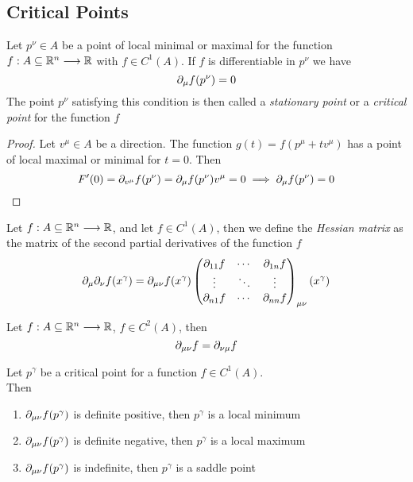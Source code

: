 \documentclass[../complete.tex]{subfiles}
\begin{document}
\subsection{Critical Points}
\begin{thm}[Fermat]
	Let $p^\nu\in A$ be a point of local minimal or maximal for the function $f:A\subseteq\mathbb{R}^n\overset{}{\longrightarrow}\mathbb{R}$ with $f\in C^1(A)$. If $f$ is differentiable in $p^\nu$ we have
	\begin{equation}
		\partial_\mu f(p^\nu)=0
		\label{eq:fermthm}
	\end{equation}
	The point $p^\nu$ satisfying this condition is then called a \textit{stationary point} or a \textit{critical point} for the function $f$
\end{thm}
\begin{proof}
	Let $v^\mu\in A$ be a direction. The function $g(t)=f(p^\mu+tv^\mu)$ has a point of local maximal or minimal for $t=0$. Then
	\begin{equation}
		F'(0)=\partial_{v^\mu}f(p^\nu)=\partial_\mu f(p^\nu)v^\mu=0\implies\partial_\mu f(p^\nu)=0
		\label{eq:frmthmproof}
	\end{equation}
\end{proof}
\begin{dfn}
	Let $f:A\subseteq\mathbb{R}^n\overset{}{\longrightarrow}\mathbb{R}$, and let $f\in C^1(A)$, then we define the \textit{Hessian matrix} as the matrix of the second partial derivatives of the function $f$
	\begin{equation}
		\partial_\mu\partial_\nu f(x^\gamma)=\partial_{\mu\nu}f(x^\gamma)\begin{pmatrix}\partial_{11}f&\cdots&\partial_{1n}f\\\vdots&\ddots&\vdots\\\partial_{n1}f&\cdots&\partial_{nn}f\end{pmatrix}_{\mu\nu}(x^\gamma)
		\label{eq:hessianmatrix}
	\end{equation}
\end{dfn}
\begin{thm}[Schwarz]
	Let $f:A\subseteq\mathbb{R}^n\overset{}{\longrightarrow}\mathbb{R}$, $f\in C^2(A)$, then
	\begin{equation}
		\partial_{\mu\nu}f=\partial_{\nu\mu}f
		\label{eq:simmhess}
	\end{equation}
\end{thm}
\begin{dfn}
	Let $p^\gamma$ be a critical point for a function $f\in C^1(A)$.\\
	Then
	\begin{enumerate}
	\item $\partial_{\mu\nu}f(p^\gamma)$ is definite positive, then $p^\gamma$ is a local minimum
	\item $\partial_{\mu\nu}f(p^\gamma)$ is definite negative, then $p^\gamma$ is a local maximum
	\item $\partial_{\mu\nu}f(p^\gamma)$ is indefinite, then $p^\gamma$ is a saddle point
	\end{enumerate}
\end{dfn}
\end{document}
